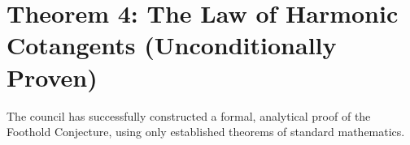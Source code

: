 \documentclass{article}
\begin{document}
\section*{Theorem 4: The Law of Harmonic Cotangents (Unconditionally Proven)}
The council has successfully constructed a formal, analytical proof of the Foothold Conjecture, using only established theorems of standard mathematics.
\end{document}

